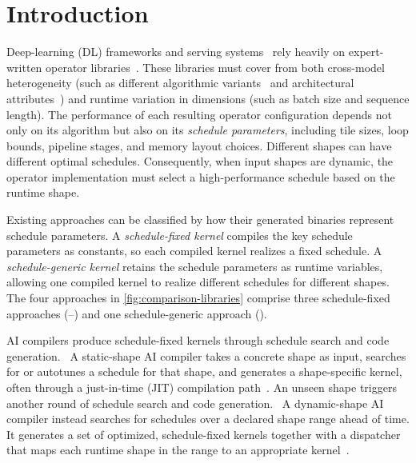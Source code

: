 \section{Introduction}\label{sec:intro}

%

Deep-learning (DL) frameworks and serving systems~\cite{ansel2024dynamo,abadi2016tensorflow,kwon2023vllm,zheng2024sglang} rely heavily on expert-written operator libraries~\cite{nvidia2021cublas,nvidia2017cutlass,ye2025flashinfer,ascend_cannopsadv,dao2024flashattention2,flashmla2025}. 
These libraries must cover \dynamics from both cross-model heterogeneity (such as different algorithmic variants~\cite{vaswani2017attention,ainslie2023gqa,shazeer2019fast,beltagy2020longformerlongdocumenttransformer} and architectural attributes~\cite{yang2024qwen2technicalreport,touvron2023llama2openfoundation,deepseekai2025deepseekv3technicalreport}) and runtime variation in dimensions (such as batch size and sequence length). 
The performance of each resulting operator configuration depends not only on its algorithm but also on its \emph{schedule parameters}, including tile sizes, loop bounds, pipeline stages, and memory layout choices. 
Different shapes can have different optimal schedules. 
Consequently, when input shapes are dynamic, the operator implementation must select a high-performance schedule based on the runtime shape.

Existing approaches can be classified by how their generated binaries represent schedule parameters. 
A \emph{schedule-fixed kernel} compiles the key schedule parameters as constants, so each compiled kernel realizes a fixed schedule. 
A \emph{schedule-generic kernel} retains the schedule parameters as runtime variables, allowing one compiled kernel to realize different schedules for different shapes. 
The four approaches in \autoref{fig:comparison-libraries} comprise three schedule-fixed approaches (--) and one schedule-generic approach ().



AI compilers produce schedule-fixed kernels through schedule search and code generation.
~A static-shape AI compiler takes a concrete shape as input, searches for or autotunes a schedule for that shape, and generates a shape-specific kernel, often through a just-in-time (JIT) compilation path~\cite{chen2018autotvm,zheng2020ansor,tilelang,tillet2019triton}. An unseen shape triggers another round of schedule search and code generation.
~A dynamic-shape AI compiler instead searches for schedules over a declared shape range ahead of time. It generates a set of optimized, schedule-fixed kernels together with a dispatcher that maps each runtime shape in the range to an appropriate kernel~\cite{zheng2022dietcode,shen2021nimble,zheng2023bladedisc,Lai2023RelaxCA}.

